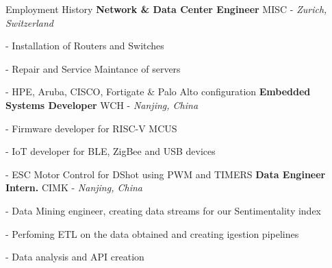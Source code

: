 \begin{rubric}{Employment History}
%
	\textbf{Network \& Data Center Engineer} MISC - \emph{Zurich, Switzerland}
	\par - Installation of Routers and Switches
	\par - Repair and Service Maintance of servers
	\par - HPE, Aruba, CISCO, Fortigate \& Palo Alto configuration
%
%
%
\entry*[2021 -- 2024]%
	\textbf{Embedded Systems Developer} WCH - \emph{Nanjing, China}
	\par - Firmware developer for RISC-V MCUS
	\par - IoT developer for BLE, ZigBee and USB devices
	\par - ESC Motor Control for DShot using PWM and TIMERS
%
%
\entry*[2019 -- 2020]%
	\textbf{Data Engineer Intern.} CIMK - \emph{Nanjing, China}
	\par - Data Mining engineer, creating data streams for our Sentimentality index
	\par - Perfoming ETL on the data obtained and creating igestion pipelines
	\par - Data analysis and API creation
%
\end{rubric}